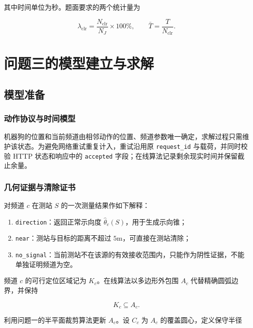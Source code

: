 其中时间单位为秒。题面要求的两个统计量为

\begin{equation}
\lambda_{\mathrm{clr}}=\frac{N_{\mathrm{clr}}}{N_J}\times100\%,
\qquad
\bar T=\frac{T}{N_{\mathrm{clr}}}.
\label{eq:q3_metrics}
\end{equation}

\section{问题三的模型建立与求解}

\subsection{模型准备}

\subsubsection{动作协议与时间模型}

机器狗的位置和当前频道由相邻动作的位置、频道参数唯一确定，求解过程只需维护该状态。为避免网络重试重复计入，重试沿用原 \texttt{request\_id} 与载荷，并同时校验 HTTP 状态和响应中的 \texttt{accepted} 字段；在线算法记录剩余现实时间并保留截止余量。

\subsubsection{几何证据与清除证书}

对频道 $c$ 在测站 $S$ 的一次测量结果作如下解释：

\begin{enumerate}
\item \texttt{direction}：返回正常示向度 $\hat\theta_c(S)$，用于生成示向锥；
\item \texttt{near}：测站与目标的距离不超过 $5\mathrm{m}$，可直接在测站清除；
\item \texttt{no\_signal}：当前测站不在该源的有效接收范围内，只能作为阴性证据，不能单独证明频道为空。
\end{enumerate}

频道 $c$ 的可行定位区域记为 $K_c$。在线算法以多边形外包围 $A_c$ 代替精确圆弧边界，并保持

\begin{equation}
K_c\subseteq A_c.
\label{eq:q3_outer_contain}
\end{equation}

利用问题一的半平面裁剪算法更新 $A_c$\cite{sutherland1974}。设 $C_c$ 为 $A_c$ 的覆盖圆心，定义保守半径

